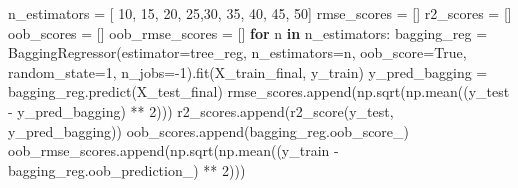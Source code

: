 \documentclass[
  letterpaper,
  DIV=11,
  numbers=noendperiod]{scrreprt}
\newenvironment{Shaded}{\begin{snugshade}}{\end{snugshade}}
\newcommand{\ControlFlowTok}[1]{\textcolor[rgb]{0.00,0.23,0.31}{\textbf{#1}}}
\newcommand{\DecValTok}[1]{\textcolor[rgb]{0.68,0.00,0.00}{#1}}
\newcommand{\KeywordTok}[1]{\textcolor[rgb]{0.00,0.23,0.31}{\textbf{#1}}}
\newcommand{\NormalTok}[1]{\textcolor[rgb]{0.00,0.23,0.31}{#1}}
\newcommand{\OperatorTok}[1]{\textcolor[rgb]{0.37,0.37,0.37}{#1}}
\newcommand{\VariableTok}[1]{\textcolor[rgb]{0.07,0.07,0.07}{#1}}
\begin{document}
\begin{Shaded}
\begin{Highlighting}[]
\NormalTok{n\_estimators }\OperatorTok{=}\NormalTok{ [ }\DecValTok{10}\NormalTok{, }\DecValTok{15}\NormalTok{, }\DecValTok{20}\NormalTok{, }\DecValTok{25}\NormalTok{,}\DecValTok{30}\NormalTok{, }\DecValTok{35}\NormalTok{, }\DecValTok{40}\NormalTok{, }\DecValTok{45}\NormalTok{, }\DecValTok{50}\NormalTok{]}
\NormalTok{rmse\_scores }\OperatorTok{=}\NormalTok{ []}
\NormalTok{r2\_scores }\OperatorTok{=}\NormalTok{ []}
\NormalTok{oob\_scores }\OperatorTok{=}\NormalTok{ []}
\NormalTok{oob\_rmse\_scores }\OperatorTok{=}\NormalTok{ []}
\ControlFlowTok{for}\NormalTok{ n }\KeywordTok{in}\NormalTok{ n\_estimators:}
\NormalTok{    bagging\_reg }\OperatorTok{=}\NormalTok{ BaggingRegressor(estimator}\OperatorTok{=}\NormalTok{tree\_reg, n\_estimators}\OperatorTok{=}\NormalTok{n, oob\_score}\OperatorTok{=}\VariableTok{True}\NormalTok{, random\_state}\OperatorTok{=}\DecValTok{1}\NormalTok{,}
\NormalTok{                        n\_jobs}\OperatorTok{={-}}\DecValTok{1}\NormalTok{).fit(X\_train\_final, y\_train)}
\NormalTok{    y\_pred\_bagging }\OperatorTok{=}\NormalTok{ bagging\_reg.predict(X\_test\_final)}
\NormalTok{    rmse\_scores.append(np.sqrt(np.mean((y\_test }\OperatorTok{{-}}\NormalTok{ y\_pred\_bagging) }\OperatorTok{**} \DecValTok{2}\NormalTok{)))}
\NormalTok{    r2\_scores.append(r2\_score(y\_test, y\_pred\_bagging))}
\NormalTok{    oob\_scores.append(bagging\_reg.oob\_score\_)}
\NormalTok{    oob\_rmse\_scores.append(np.sqrt(np.mean((y\_train }\OperatorTok{{-}}\NormalTok{ bagging\_reg.oob\_prediction\_) }\OperatorTok{**} \DecValTok{2}\NormalTok{)))}


\end{Highlighting}
\end{Shaded}
\end{document}
